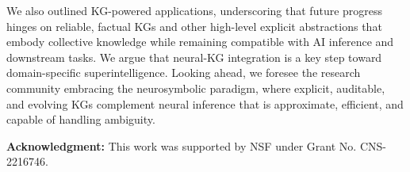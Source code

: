 \documentclass[10pt]{article}
\begin{document}
We also outlined KG-powered applications, underscoring that future progress hinges on reliable, factual KGs and other high-level explicit abstractions that embody collective knowledge while remaining compatible with AI inference and downstream tasks. We argue that neural-KG integration is a key step toward domain-specific superintelligence. Looking ahead, we foresee the research community embracing the neurosymbolic paradigm, where explicit, auditable, and evolving KGs complement neural inference that is approximate, efficient, and capable of handling ambiguity.

\vspace*{1mm}
\noindent
\textbf{Acknowledgment:} This work was supported by NSF under Grant No. CNS-2216746.

\medskip


\end{document}
